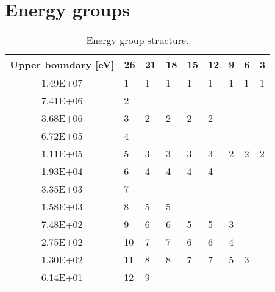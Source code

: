 \documentclass[11pt,letterpaper]{article}
\begin{document}
\section{Energy groups}

\begin{table}[htbp!]
  \centering
  \caption{Energy group structure.}
  \begin{tabular}{c|l|l|l|l|l|l|l|l}
  \toprule
  Upper boundary [eV] & 26        & 21        & 18        & 15        & 12        & 9        & 6        & 3         \\
  \midrule
  1.49E+07            & 1         & 1         & 1         & 1         & 1         & 1        & 1        & 1         \\ \cline{1-2}
  7.41E+06            & 2         &           &           &           &           &          &          &           \\ \cline{1-6}
  3.68E+06            & 3         & 2         & 2         & 2         & 2         &          &          &           \\ \cline{1-2}
  6.72E+05            & 4         &           &           &           &           &          &          &           \\ \hline
  1.11E+05            & 5         & 3         & 3         & 3         & 3         & 2        & 2        & 2         \\ \cline{1-6}
  1.93E+04            & 6         & 4         & 4         & 4         & 4         &          &          &           \\ \cline{1-2}
  3.35E+03            & 7         &           &           &           &           &          &          &           \\ \cline{1-4}
  1.58E+03            & 8         & 5         & 5         &           &           &          &          &           \\ \cline{1-7}
  7.48E+02            & 9         & 6         & 6         & 5         & 5         & 3        &          &           \\ \cline{1-7}
  2.75E+02            & 10        & 7         & 7         & 6         & 6         & 4        &          &           \\ \cline{1-8}
  1.30E+02            & 11        & 8         & 8         & 7         & 7         & 5        & 3        &           \\ \cline{1-3}
  6.14E+01            & 12        & 9         &           &           &           &          &          &           \\ \cline{1-5}

\end{tabular}
\end{table}
\end{document}
